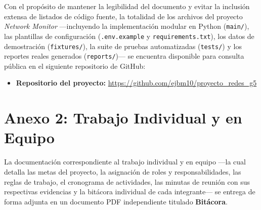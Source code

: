 \documentclass[12pt,a4paper]{article}
\begin{document}
Con el propósito de mantener la legibilidad del documento y evitar la inclusión extensa de listados de código fuente, la totalidad de los archivos del proyecto \textit{Network Monitor} —incluyendo la implementación modular en Python (\texttt{main/}), las plantillas de configuración (\texttt{.env.example} y \texttt{requirements.txt}), los datos de demostración (\texttt{fixtures/}), la suite de pruebas automatizadas (\texttt{tests/}) y los reportes reales generados (\texttt{reports/})— se encuentra disponible para consulta pública en el siguiente repositorio de GitHub:

\begin{itemize}
    \item \textbf{Repositorio del proyecto:} \url{https://github.com/ejbm10/proyecto_redes_g5}
\end{itemize}


\section{Anexo 2: Trabajo Individual y en Equipo}

La documentación correspondiente al trabajo individual y en equipo —la cual detalla las metas del proyecto, la asignación de roles y responsabilidades, las reglas de trabajo, el cronograma de actividades, las minutas de reunión con sus respectivas evidencias y la bitácora individual de cada integrante— se entrega de forma adjunta en un documento PDF independiente titulado \textbf{Bitácora}.
\end{document}
